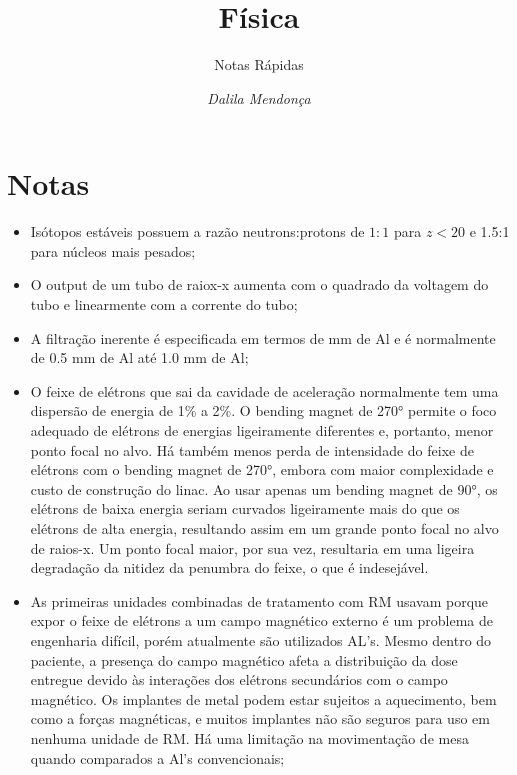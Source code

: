 \documentclass[11pt,a4paper]{article}
\title{Física}
\author{Notas Rápidas\nocite{*}}
\date{\textit{Dalila Mendonça}}
\begin{document}
	\maketitle

\section{Notas}

\begin{itemize}
    \item Isótopos estáveis possuem a razão neutrons:protons de $1:1$ para $z <  20$ e 1.5:1 para núcleos mais pesados;
    
    \item O output de um tubo de raiox-x aumenta com o quadrado da voltagem do tubo  e linearmente com a corrente do tubo;
    
    \item A filtração inerente é especificada em termos de mm de Al e é normalmente de 0.5 mm de Al até 1.0 mm de Al;
    
    \item O feixe de elétrons que sai da cavidade de aceleração normalmente tem uma dispersão de energia de 1\% a 2\%. O bending magnet de \ang{270} permite o foco adequado de elétrons de energias ligeiramente diferentes e, portanto, menor ponto focal no alvo. Há também menos perda de intensidade do feixe de elétrons com o bending magnet de \ang{270}, embora com maior complexidade e custo de construção do linac. Ao usar apenas um bending magnet de \ang{90}, os elétrons de baixa energia seriam curvados ligeiramente mais do que os elétrons de alta energia, resultando assim em um grande ponto focal no alvo de raios-x. Um ponto focal maior, por sua vez, resultaria em uma ligeira degradação da nitidez da penumbra do feixe, o que é indesejável.
    
    \item As primeiras unidades combinadas de tratamento com RM usavam  porque expor o feixe de elétrons a um campo magnético externo é um problema de engenharia difícil, porém atualmente são utilizados AL's. Mesmo dentro do paciente, a presença do campo magnético afeta a distribuição da dose entregue devido às interações dos elétrons secundários com o campo magnético. Os implantes de metal podem estar sujeitos a aquecimento, bem como a forças magnéticas, e muitos implantes não são seguros para uso em nenhuma unidade de RM. Há uma limitação na movimentação de mesa quando comparados a Al's convencionais;
    

\end{itemize}
\end{document}
